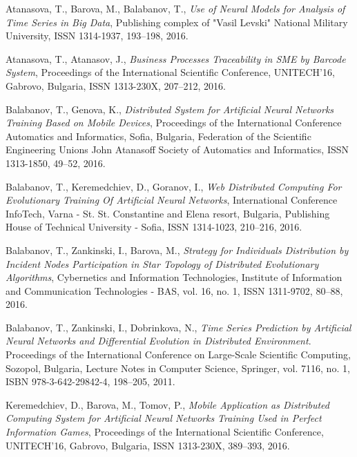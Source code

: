 \documentclass{llncs}
\begin{document}
\begin{thebibliography}{99}

 Atanasova, T., Barova, M., Balabanov, T., \textit{Use of Neural Models for Analysis of Time Series in Big Data}, Publishing complex of "Vasil Levski" National Military University, ISSN 1314-1937, 193--198, 2016.

 Atanasova, T., Atanasov, J., \textit{Business Processes Traceability in SME by Barcode System}, Proceedings of the International Scientific Conference, UNITECH’16, Gabrovo, Bulgaria, ISSN 1313-230X,  207--212, 2016.

 Balabanov, T., Genova, K., \textit{Distributed System for Artificial Neural Networks Training Based on Mobile Devices}, Proceedings of the International Conference Automatics and Informatics, Sofia, Bulgaria, Federation of the Scientific Engineering Unions John Atanasoff Society of Automatics and Informatics, ISSN 1313-1850, 49--52, 2016.

 Balabanov, T., Keremedchiev, D., Goranov, I., \textit{Web Distributed Computing For Evolutionary Training Of Artificial Neural Networks}, International Conference InfoTech, Varna - St. St. Constantine and Elena resort, Bulgaria, Publishing House of Technical University - Sofia, ISSN 1314-1023, 210--216, 2016.

 Balabanov, T., Zankinski, I., Barova, M., \textit{Strategy for Individuals Distribution by Incident Nodes Participation in Star Topology of Distributed Evolutionary Algorithms}, Cybernetics and Information Technologies, Institute of Information and Communication Technologies - BAS, vol. 16, no. 1, ISSN 1311-9702, 80--88, 2016.

 Balabanov, T., Zankinski, I., Dobrinkova, N., \textit{Time Series Prediction by Artificial Neural Networks and Differential Evolution in Distributed Environment}. Proceedings of the International Conference on Large-Scale Scientific Computing, Sozopol, Bulgaria, Lecture Notes in Computer Science, Springer, vol. 7116, no. 1, ISBN 978-3-642-29842-4, 198–205, 2011. 

 Keremedchiev, D., Barova, M., Tomov, P., \textit{Mobile Application as Distributed Computing System for Artificial Neural Networks Training Used in Perfect Information Games}, Proceedings of the International Scientific Conference, UNITECH’16, Gabrovo, Bulgaria, ISSN 1313-230X, 389--393, 2016.


\end{thebibliography}
\end{document}
